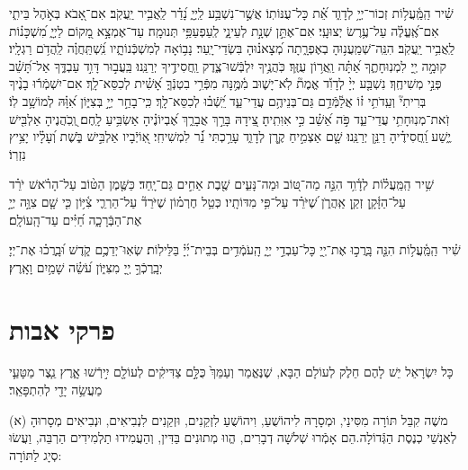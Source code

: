 \documentclass[twoside, openany, parskip=half, 11pt]{book}
\begin{document}
 שִׁ֗יר  הַֽמַּֽ֫עֲל֥וֹת זְכוֹר־יְיָ֥ לְדָוִ֑ד אֵ֝֗ת כָּל־עֻנּוֹתֽוֹ׃ אֲשֶׁ֣ר־נִשְׁבַּ֥ע לַֽיְיָ֑ נָ֝דַ֗ר לַֽאֲבִ֥יר יַֽעֲקֹֽב׃ אִם־אָ֭בֹא בְּאֹ֣הֶל בֵּיתִ֑י אִם־אֶֽ֝עֱלֶ֗ה עַל־עֶ֥רֶשׂ יְצוּעָֽי׃ אִם־אֶתֵּ֣ן שְׁנָ֣ת לְעֵינָ֑י לְֽעַפְעַפַּ֥י תְּנוּמָֽה׃ עַד־אֶמְצָ֣א מָ֭קוֹם לַיְיָ֑ מִ֝שְׁכָּנ֗וֹת לַֽאֲבִ֥יר יַֽעֲקֹֽב׃ הִנֵּֽה־שְׁמַֽעֲנ֥וּהָ בְאֶפְרָ֑תָה מְ֝צָאנ֗וּהָ בִּשְׂדֵי־יָֽעַר׃ נָב֥וֹאָה לְמִשְׁכְּֿנוֹתָ֑יו נִֽ֝שְׁתַּֽחֲוֶ֗ה לַֽהֲדֹ֥ם רַגְלָֽיו׃ קוּמָ֣ה יְ֖יָ לִמְנֽוּחָתֶ֑ךָ אַ֝תָּ֗ה וַֽאֲר֥וֹן עֻזֶּֽךָ׃ כֹּֽהֲנֶ֥יךָ יִלְבְּֿשׁוּ־צֶ֑דֶק וַֽחֲסִידֶ֥יךָ יְרַנֵּֽנוּ׃ בַּֽעֲב֣וּר דָּוִ֣ד עַבְדֶּ֑ךָ אַל־תָּ֝שֵׁ֗ב פְּנֵ֣י מְשִׁיחֶֽךָ׃ נִשְׁבַּ֤ע יְיָ֨ לְדָוִ֡ד אֱמֶת֘ לֹֽא־יָשׁ֢וּב מִ֫מֶּ֥נָּה מִפְּֿרִ֥י בִטְנְֿךָ֑ אָ֝שִׁ֗ית לְכִסֵּא־לָֽךְ׃ אִם־יִשְׁמְֿר֬וּ בָנֶ֨יךָ בְּרִיתִי֘ וְעֵֽדֹתִ֥י ז֗וֹ אֲלַ֫מְּֿדֵ֥ם גַּם־בְּנֵיהֶ֥ם עֲדֵי־עַ֑ד יֵֽ֝שְֿׁב֗וּ לְכִסֵּא־לָֽךְ׃ כִּֽי־בָחַ֣ר יְיָ֣ בְּצִיּ֑וֹן אִ֝וָּ֗הּ לְמוֹשָׁ֥ב לֽוֹ׃ זֹֽאת־מְנֽוּחָתִ֥י עֲדֵי־עַ֑ד פֹּ֣ה אֵ֝שֵׁ֗ב כִּ֣י אִוִּתִֽיהָ׃ צֵ֭ידָהּ בָּרֵ֣ךְ אֲבָרֵ֑ךְ אֶ֝בְיוֹנֶ֗יהָ אַשְׂבִּ֥יעַ לָֽחֶם׃ וְֽ֭כֹֽהֲנֶיהָ אַלְבִּ֖ישׁ יֶ֑שַׁע וַֽ֝חֲסִידֶ֗יהָ רַנֵּ֥ן יְרַנֵּֽנוּ׃ שָׁ֤ם אַצְמִ֣יחַ קֶ֣רֶן לְדָוִ֑ד עָרַ֥כְתִּי נֵ֝֗ר לִמְשִׁיחִֽי׃ אֽ֭וֹיְֿבָיו אַלְבִּ֣ישׁ בֹּ֑שֶׁת וְ֝עָלָ֗יו יָצִ֥יץ נִזְרֽוֹ׃

 שִׁ֥יר  הַֽמַּֽעֲל֗וֹת לְדָ֫וִ֥ד הִנֵּ֣ה מַה־טּ֭וֹב וּמַה־נָּעִ֑ים שֶׁ֖בֶת אַחִ֣ים גַּם־יָֽחַד׃ כַּשֶּׁ֤מֶן הַטּ֨וֹב עַל־הָרֹ֗אשׁ יֹרֵ֗ד עַל־הַזָּ֫קָ֥ן זְקַ֥ן אַֽהֲרֹ֑ן שֶׁ֝יֹּרֵ֗ד עַל־פִּ֥י מִדּוֹתָֽיו׃ כְּטַ֥ל חֶרְמ֗וֹן שֶׁיֹּרֵד֘ עַל־הַרְרֵ֢י צִ֫יּ֥וֹן כִּ֤י שָׁ֤ם צִוָּ֣ה יְיָ֣ אֶת־הַבְּֿרָכָ֑ה חַ֝יִּ֗ים עַד־הָֽעוֹלָֽם׃

 שִׁ֗יר  הַֽמַּֽ֫עֲל֥וֹת הִנֵּ֤ה בָּֽרֲכ֣וּ אֶת־יְ֖יָ כָּל־עַבְדֵ֣י יְיָ֑ הָֽעֹמְֿדִ֥ים בְּבֵית־יְ֜יָ֗ בַּלֵּילֽוֹת׃ שְׂאֽוּ־יְדֵכֶ֥ם קֹ֑דֶשׁ וּ֝בָֽרֲכ֗וּ אֶת־יְיָ׃ יְבָֽרֶכְֿךָ֣ יְ֖יָ מִצִּיּ֑וֹן עֹ֝שֵׂ֗ה שָׁמַ֥יִם וָאָֽרֶץ׃ 



\section[פרקי אבות]{ פרקי אבות }
\label{avos}

\newcommand{\kolyisroel}{
כָּל יִשְׂרָאֵל יֵשׁ לָהֶם חֵלֶק לְעוֹלָם הַבָּא, שֶׁנֶּאֱמַר וְעַמֵּךְ֙ כֻּלָּ֣ם צַדִּיקִ֔ים לְעוֹלָ֖ם
\source{ישעשה ס}
 יִ֣ירְֿשׁוּ אָ֑רֶץ נֵ֧צֶר מַטָּעַ֛י מַעֲשֵׂ֥ה יָדַ֖י לְהִתְפָּאֵֽר׃
}

\kolyisroel

(א) משֶׁה קִבֵּל תּוֹרָה מִסִּינַי, וּמְסָרָהּ לִיהוֹשֻׁעַ, וִיהוֹשֻׁעַ לִזְקֵנִים, וּזְקֵנִים לִנְבִיאִים, וּנְבִיאִים מְסָרוּהָ לְאַנְשֵׁי כְנֶסֶת הַגְּֿדוֹלָה.הֵם אָמְֿרוּ שְׁלשָׁה דְבָרִים, הֱווּ מְתוּנִים בַּדִּין, וְהַעֲמִידוּ תַלְמִידִים הַרְבֵּה, וַעֲשׂוּ סְיָג לַתּוֹרָה:
\end{document}
